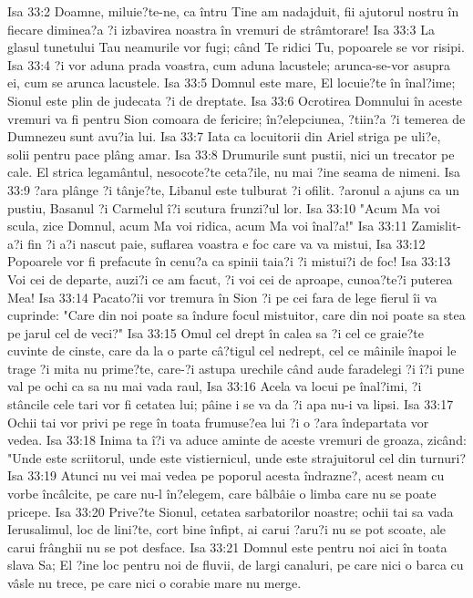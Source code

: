 Isa 33:2  Doamne, miluie?te-ne, ca întru Tine am nadajduit, fii ajutorul nostru în fiecare diminea?a ?i izbavirea noastra în vremuri de strâmtorare!
Isa 33:3  La glasul tunetului Tau neamurile vor fugi; când Te ridici Tu, popoarele se vor risipi.
Isa 33:4  ?i vor aduna prada voastra, cum aduna lacustele; arunca-se-vor asupra ei, cum se arunca lacustele.
Isa 33:5  Domnul este mare, El locuie?te în înal?ime; Sionul este plin de judecata ?i de dreptate.
Isa 33:6  Ocrotirea Domnului în aceste vremuri va fi pentru Sion comoara de fericire; în?elepciunea, ?tiin?a ?i temerea de Dumnezeu sunt avu?ia lui.
Isa 33:7  Iata ca locuitorii din Ariel striga pe uli?e, solii pentru pace plâng amar.
Isa 33:8  Drumurile sunt pustii, nici un trecator pe cale. El strica legamântul, nesocote?te ceta?ile, nu mai ?ine seama de nimeni.
Isa 33:9  ?ara plânge ?i tânje?te, Libanul este tulburat ?i ofilit. ?aronul a ajuns ca un pustiu, Basanul ?i Carmelul î?i scutura frunzi?ul lor.
Isa 33:10  "Acum Ma voi scula, zice Domnul, acum Ma voi ridica, acum Ma voi înal?a!"
Isa 33:11  Zamislit-a?i fin ?i a?i nascut paie, suflarea voastra e foc care va va mistui,
Isa 33:12  Popoarele vor fi prefacute în cenu?a ca spinii taia?i ?i mistui?i de foc!
Isa 33:13  Voi cei de departe, auzi?i ce am facut, ?i voi cei de aproape, cunoa?te?i puterea Mea!
Isa 33:14  Pacato?ii vor tremura în Sion ?i pe cei fara de lege fierul îi va cuprinde: "Care din noi poate sa îndure focul mistuitor, care din noi poate sa stea pe jarul cel de veci?"
Isa 33:15  Omul cel drept în calea sa ?i cel ce graie?te cuvinte de cinste, care da la o parte câ?tigul cel nedrept, cel ce mâinile înapoi le trage ?i mita nu prime?te, care-?i astupa urechile când aude faradelegi ?i î?i pune val pe ochi ca sa nu mai vada raul,
Isa 33:16  Acela va locui pe înal?imi, ?i stâncile cele tari vor fi cetatea lui; pâine i se va da ?i apa nu-i va lipsi.
Isa 33:17  Ochii tai vor privi pe rege în toata frumuse?ea lui ?i o ?ara îndepartata vor vedea.
Isa 33:18  Inima ta î?i va aduce aminte de aceste vremuri de groaza, zicând: "Unde este scriitorul, unde este vistiernicul, unde este strajuitorul cel din turnuri?
Isa 33:19  Atunci nu vei mai vedea pe poporul acesta îndrazne?, acest neam cu vorbe încâlcite, pe care nu-l în?elegem, care bâlbâie o limba care nu se poate pricepe.
Isa 33:20  Prive?te Sionul, cetatea sarbatorilor noastre; ochii tai sa vada Ierusalimul, loc de lini?te, cort bine înfipt, ai carui ?aru?i nu se pot scoate, ale carui frânghii nu se pot desface.
Isa 33:21  Domnul este pentru noi aici în toata slava Sa; El ?ine loc pentru noi de fluvii, de largi canaluri, pe care nici o barca cu vâsle nu trece, pe care nici o corabie mare nu merge.

